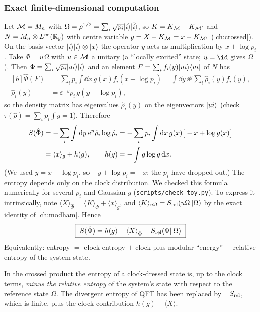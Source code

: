 \subsubsection{Exact finite-dimensional computation}
Let $\mathcal{M}=M_n$ with $\Omega=\rho^{1/2}=\sum_i\sqrt{p_i}\lvert i\rangle\lvert \bar i\rangle$, so $K=K_{\mathcal{M}}-K_{\mathcal{M}'}$ and $N=M_n\otimes L^\infty(\mathbb{R}_y)$ with centre variable $y=X-K_{\mathcal{M}}=x-K_{\mathcal{M}'}$ (\cref{ch:crossed}). On the basis vector $\lvert i\rangle\lvert \bar i\rangle\otimes\lvert x\rangle$ the operator $y$ acts as multiplication by $x+\log p_i$. Take $\Phi=u\Omega$ with $u\in\mathcal{M}$ a unitary (a ``locally excited'' state; $u=\id$ gives $\Omega$). Then $\Phi=\sum_i\sqrt{p_i}\lvert ui\rangle\lvert \bar i\rangle$ and an element $F=\sum_if_i(y)\lvert ui\rangle\langle ui\rvert$ of $N$ has
\begin{equation}
\begin{aligned}[b]\hat\Phi(F)&=\sum_ip_i\int\dd x\,g(x)f_i(x+\log p_i)=\int\dd y\,\ee^{y}\sum_i\hat\rho_i(y)f_i(y),\\ \hat\rho_i(y)&=\ee^{-y}p_i\,g(y-\log p_i),\end{aligned}
\end{equation}
so the density matrix has eigenvalues $\hat\rho_i(y)$ on the eigenvectors $\lvert ui\rangle$ (check $\tau(\hat\rho)=\sum_ip_i\int g=1$). Therefore
\begin{align}
S(\hat\Phi)&=-\sum_i\int\mathrm{d} y\,\mathrm{e}^y\hat\rho_i\log\hat\rho_i
=-\sum_ip_i\int\mathrm{d} x\,g(x)\big[-x+\log g(x)\big]\notag\\
&=\langle x\rangle_g+h(g),\qquad h(g)=-\int g\log g\,\mathrm{d} x.\label{eq:Sexact}
\end{align}
(We used $y=x+\log p_i$, so $-y+\log p_i=-x$; the $p_i$ have dropped out.) The entropy depends only on the clock distribution. We checked this formula numerically for several $p_i$ and Gaussian $g$ (\texttt{scripts/check\_toy.py}). To express it intrinsically, note $\langle X\rangle_{\hat\Phi}=\langle K\rangle_\Phi+\langle x\rangle_g$, and $\langle K\rangle_{u\Omega}=S_{\rm rel}(u\Omega\|\Omega)$ by the exact identity of \cref{ch:modham}. Hence
\begin{equation}
\boxed{\ S(\hat\Phi)=h(g)+\langle X\rangle_{\hat\Phi}-S_{\rm rel}(\Phi\|\Omega)\ }\label{eq:Srel}
\end{equation}
Equivalently: entropy $=$ clock entropy $+$ clock-plus-modular ``energy'' $-$ relative entropy of the system state.

\begin{keyidea}
In the crossed product the entropy of a clock-dressed state is, up to the clock terms, \emph{minus the relative entropy} of the system's state with respect to the reference state $\Omega$. The divergent entropy of QFT has been replaced by $-S_{\rm rel}$, which is finite, plus the clock contribution $h(g)+\langle X\rangle$.
\end{keyidea}

